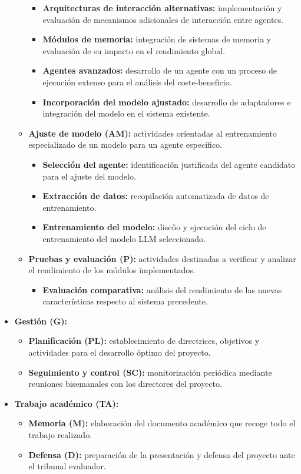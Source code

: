 \begin{itemize}
\begin{itemize}
        \begin{itemize}
          \item\textbf{Arquitecturas de interacción alternativas:} implementación y evaluación de mecanismos adicionales de interacción entre agentes.
          \item\textbf{Módulos de memoria:} integración de sistemas de memoria y evaluación de su impacto en el rendimiento global. 
          \item\textbf{Agentes avanzados:} desarrollo de un agente con un proceso de ejecución extenso para el análisis del coste-beneficio.
          \item\textbf{Incorporación del modelo ajustado:} desarrollo de adaptadores e integración del modelo en el sistema existente.
        \end{itemize}
      \item\textbf{Ajuste de modelo (AM):} actividades orientadas al entrenamiento especializado de un modelo para un agente específico.
      \begin{itemize}
        \item\textbf{Selección del agente:} identificación justificada del agente candidato para el ajuste del modelo.
        \item\textbf{Extracción de datos:} recopilación automatizada de datos de entrenamiento.
        \item\textbf{Entrenamiento del modelo:} diseño y ejecución del ciclo de entrenamiento del modelo LLM seleccionado.
      \end{itemize}
      \item\textbf{Pruebas y evaluación (P):} actividades destinadas a verificar y analizar el rendimiento de los módulos implementados.
        \begin{itemize}
          \item\textbf{Evaluación comparativa: } análisis del rendimiento de las nuevas características respecto al sistema precedente.
        \end{itemize}
    \end{itemize}
  \item\textbf{Gestión (G):} 
    \begin{itemize}
      \item\textbf{Planificación (PL):} establecimiento de directrices, objetivos y actividades para el desarrollo óptimo del proyecto.
      \item\textbf{Seguimiento y control (SC):} monitorización periódica mediante reuniones bisemanales con los directores del proyecto.
    \end{itemize}
  \item\textbf{Trabajo académico (TA):}
    \begin{itemize}
      \item\textbf{Memoria (M):} elaboración del documento académico que recoge todo el trabajo realizado.
      \item\textbf{Defensa (D):} preparación de la presentación y defensa del proyecto ante el tribunal evaluador.
    \end{itemize}
\end{itemize}

